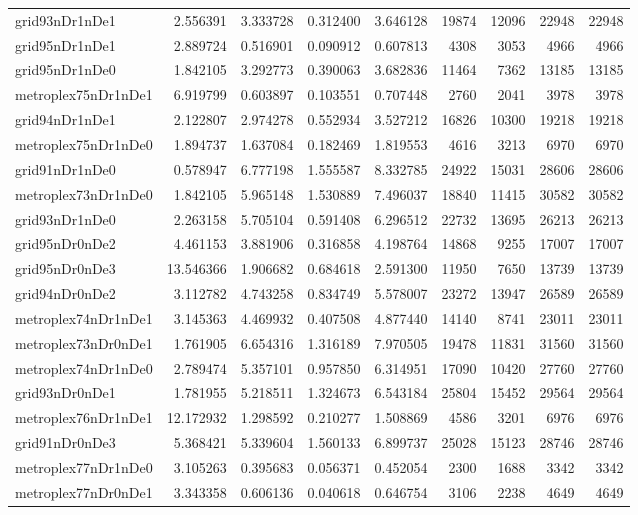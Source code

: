 \begin{longtable}{|l|r|r|r|r|r|r|r|r|}
grid93nDr1nDe1 & 2.556391 & 3.333728 & 0.312400 & 3.646128 & 19874 & 12096 & 22948 & 22948 \\
grid95nDr1nDe1 & 2.889724 & 0.516901 & 0.090912 & 0.607813 & 4308 & 3053 & 4966 & 4966 \\
grid95nDr1nDe0 & 1.842105 & 3.292773 & 0.390063 & 3.682836 & 11464 & 7362 & 13185 & 13185 \\
metroplex75nDr1nDe1 & 6.919799 & 0.603897 & 0.103551 & 0.707448 & 2760 & 2041 & 3978 & 3978 \\
grid94nDr1nDe1 & 2.122807 & 2.974278 & 0.552934 & 3.527212 & 16826 & 10300 & 19218 & 19218 \\
metroplex75nDr1nDe0 & 1.894737 & 1.637084 & 0.182469 & 1.819553 & 4616 & 3213 & 6970 & 6970 \\
grid91nDr1nDe0 & 0.578947 & 6.777198 & 1.555587 & 8.332785 & 24922 & 15031 & 28606 & 28606 \\
metroplex73nDr1nDe0 & 1.842105 & 5.965148 & 1.530889 & 7.496037 & 18840 & 11415 & 30582 & 30582 \\
grid93nDr1nDe0 & 2.263158 & 5.705104 & 0.591408 & 6.296512 & 22732 & 13695 & 26213 & 26213 \\
grid95nDr0nDe2 & 4.461153 & 3.881906 & 0.316858 & 4.198764 & 14868 & 9255 & 17007 & 17007 \\
grid95nDr0nDe3 & 13.546366 & 1.906682 & 0.684618 & 2.591300 & 11950 & 7650 & 13739 & 13739 \\
grid94nDr0nDe2 & 3.112782 & 4.743258 & 0.834749 & 5.578007 & 23272 & 13947 & 26589 & 26589 \\
metroplex74nDr1nDe1 & 3.145363 & 4.469932 & 0.407508 & 4.877440 & 14140 & 8741 & 23011 & 23011 \\
metroplex73nDr0nDe1 & 1.761905 & 6.654316 & 1.316189 & 7.970505 & 19478 & 11831 & 31560 & 31560 \\
metroplex74nDr1nDe0 & 2.789474 & 5.357101 & 0.957850 & 6.314951 & 17090 & 10420 & 27760 & 27760 \\
grid93nDr0nDe1 & 1.781955 & 5.218511 & 1.324673 & 6.543184 & 25804 & 15452 & 29564 & 29564 \\
metroplex76nDr1nDe1 & 12.172932 & 1.298592 & 0.210277 & 1.508869 & 4586 & 3201 & 6976 & 6976 \\
grid91nDr0nDe3 & 5.368421 & 5.339604 & 1.560133 & 6.899737 & 25028 & 15123 & 28746 & 28746 \\
metroplex77nDr1nDe0 & 3.105263 & 0.395683 & 0.056371 & 0.452054 & 2300 & 1688 & 3342 & 3342 \\
metroplex77nDr0nDe1 & 3.343358 & 0.606136 & 0.040618 & 0.646754 & 3106 & 2238 & 4649 & 4649 \\

\end{longtable}
